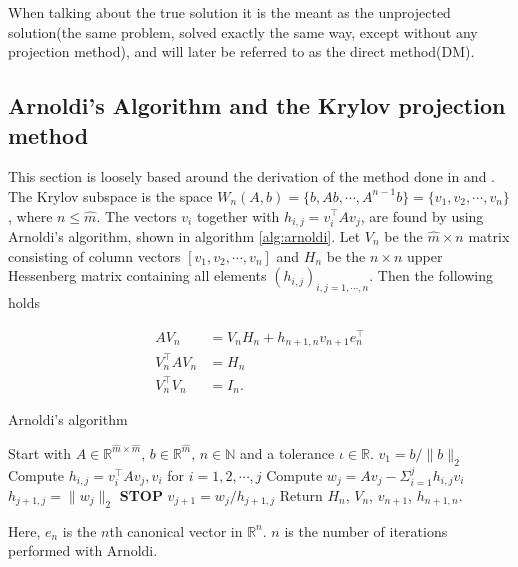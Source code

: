 When talking about the true solution it is the meant as the unprojected solution(the same problem, solved exactly the same way, except without any projection method), and will later be referred to as the direct method(DM).
\subsection{Arnoldi's Algorithm and the Krylov projection method}
This section is loosely based around the derivation of the method done in \cite{elena} and \cite{min}. \\

The Krylov subspace is the space $W_n (A,b) = \{b,Ab, \cdots, A^{n-1}b\} = \{v_1,v_2,\cdots,v_n\} $, where $n \leq \hat{m}$.
The vectors $v_i$ together with $h_{i,j} = v_i^\top Av_j$, are found by using Arnoldi's algorithm, shown in algorithm \ref{alg:arnoldi}. Let $V_n$ be the $\hat{m} \times n$ matrix consisting of column vectors $[v_1,v_2,\cdots,v_n ] $ and $H_n$ be the $n \times n$ upper Hessenberg matrix containing all elements $(h_{i,j})_{i,j=1,\cdots,n}$. Then the following holds \cite{kryprop}

\begin{equation}
\begin{aligned}
AV_n & = V_n H_n + h_{n+1,n}v_{n+1}e^\top_n  \\
V^{\top}_n AV_n &= H_n  \\
V_n^{\top} V_n &= I_n. 
\label{eqn:propA}
\end{aligned}
\end{equation}

\begin{algorithm} [h!]
\begin{algorithmic} \caption{Arnoldi's algorithm\cite{arnold}} \label{alg:arnoldi}  
\STATE Start with $A \in \mathbb{R}^{\hat{m} \times \hat{m}}$, $b \in \mathbb{R}^{\hat{m}}$, $n \in \mathbb{N}$ and a tolerance $\iota \in \mathbb{R}$.
\STATE $v_1 = b/\|b \|_2$
   \STATE Compute $h_{i,j} =  v_i^{\top}Av_j,v_i $ for $i = 1,2,\cdots, j$
    \STATE Compute $w_j = A v_j - \Sigma_{i=1}^{j} h_{i,j}v_i $
    \STATE $h_{j+1,j} = \| w_j \|_2$
        \STATE\textbf{STOP}
    \ENDIF 
   \STATE $v_{j+1} = w_j/h_{j+1,j}$
\ENDFOR
\STATE Return $H_n$, $V_n$, $v_{n+1}$, $h_{n+1,n}$.
\end{algorithmic} 
\end{algorithm}



Here, $e_n$ is the $n$th canonical vector in $\mathbb{R}^n$. $n$ is the number of iterations performed with Arnoldi.\\

